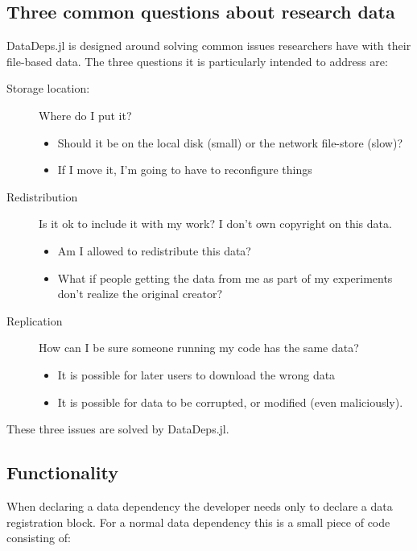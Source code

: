 \documentclass[twoside,11pt]{article}\usepackage{jmlr2e}
\begin{document}
\subsection{Three common questions about research data}
DataDeps.jl is designed around solving common issues researchers have with their file-based data.
The three questions it is particularly intended to address are:

\begin{description}
	\item[Storage location:] Where do I put it? \label{itm:where}
	\begin{itemize}
		\item Should it be on the local disk (small) or the network file-store (slow)?
		\item If I move it, I'm going to have to reconfigure things
	\end{itemize}
	\item[Redistribution] Is it ok to include it with my work? \label{itm:ownredistribute} I don't own copyright on this data.
	\begin{itemize}
		\item Am I allowed to redistribute this data?
		\item What if people getting the data from me as part of my experiments don't realize the original creator?
	\end{itemize}
	\item[Replication] How can I be sure someone running my code has the same data?
	\begin{itemize}
		\item It is possible for later users to download the wrong data
		\item It is possible for data to be corrupted, or modified (even maliciously).
	\end{itemize}
\end{description}
These three issues are solved by DataDeps.jl.

\subsection{Functionality}
When declaring a data dependency the developer needs only to declare a data registration block.
For a normal data dependency this is a small piece of code consisting of:
\end{document}
